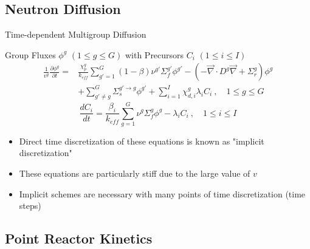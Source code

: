\documentclass[8pt,xcolor=dvipnames]{beamer}
\renewcommand{\div}{\vec{\nabla}\! \cdot \!}
\newcommand{\grad}{\vec{\nabla}}
\newcommand{\be}{\begin{equation*}}
\newcommand{\ee}{\end{equation*}}
\newcommand{\keff}{\ensuremath{k_{\textit{eff}}}}
\begin{document}
\subsection{Neutron Diffusion}

\begin{frame}{Time-dependent Multigroup Diffusion}

\vspace{-3mm}

\begin{block}{Group Fluxes $\phi^g$ $(1 \le g \le G )$ with Precursors $C_i$ $(1 \le i \le I)$}
\begin{align*}
\frac{1}{v^g} \frac{\partial \phi^g }{\partial t} =& \frac{\chi_p^g}{\keff} \sum_{g'=1}^G (1-\beta) \nu^{g'} \Sigma_f^{g'} \phi^{g'} -  \left( -\div D^g \grad  + \Sigma_r^g \right) \phi^g  \nonumber \\
&  + \sum_{g'\neq g}^G\Sigma_s^{g'\to g} \phi^{g'}  + \sum_{i=1}^I\chi_{d,i}^g\lambda_i C_i \ , \quad 1 \le g \le G 
\end{align*}
\be
\frac{dC_i}{dt} = \frac{\beta_i}{k_{eff}}\sum_{g=1}^G\nu^{g} \Sigma_f^g \phi^{g} - \lambda_i C_i \ , \quad 1 \le i \le I 
\ee
\end{block}

\begin{block}{}
\begin{itemize}
\item Direct time discretization of these equations is known as "implicit discretization"
\item These equations are particularly stiff due to the large value of $v$
\item Implicit schemes are necessary with many points of time discretization (time steps)
\end{itemize}
\end{block}

\end{frame}

\subsection{Point Reactor Kinetics}
\end{document}
